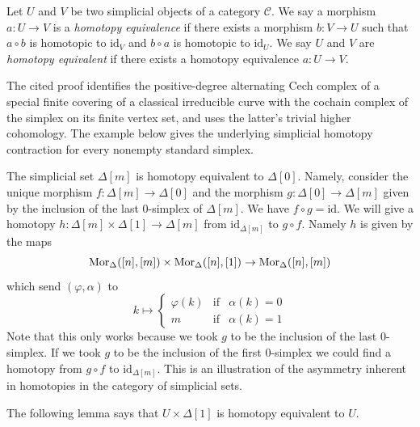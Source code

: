 \begin{definition}
\label{definition-homotopy-equivalent}
Let $U$ and $V$ be two simplicial objects of a category $\mathcal{C}$.
We say a morphism $a : U \to V$ is a {\it homotopy equivalence}
if there exists a morphism $b : V \to U$ such that $a \circ b$ is
homotopic to $\text{id}_V$ and $b \circ a$ is homotopic to $\text{id}_U$.
We say $U$ and $V$ are {\it homotopy equivalent} if there
exists a homotopy equivalence $a : U \to V$.
\end{definition}

\begin{example}
\label{example-simplex-contractible}
\begin{reference}
\cite[Chapter III, \S 1, no. 53, Lemma 4, p. 246]{FAC}
\end{reference}
\begin{history}
The cited proof identifies the positive-degree alternating Cech complex of a
special finite covering of a classical irreducible curve with the cochain
complex of the simplex on its finite vertex set, and uses the latter's
trivial higher cohomology. The example below gives the underlying simplicial
homotopy contraction for every nonempty standard simplex.
\end{history}
The simplicial set $\Delta[m]$ is homotopy equivalent to $\Delta[0]$.
Namely, consider the unique morphism $f : \Delta[m] \to \Delta[0]$ and
the morphism $g : \Delta[0] \to \Delta[m]$ given by the inclusion of the
last $0$-simplex of $\Delta[m]$. We have $f \circ g = \text{id}$.
We will give a homotopy $h : \Delta[m] \times \Delta[1] \to \Delta[m]$
from $\text{id}_{\Delta[m]}$ to $g \circ f$. Namely $h$ is given by
the maps
$$
\mathop{\mathrm{Mor}}\nolimits_\Delta([n], [m]) \times \mathop{\mathrm{Mor}}\nolimits_\Delta([n], [1]) \to \mathop{\mathrm{Mor}}\nolimits_\Delta([n], [m])
$$
which send $(\varphi, \alpha)$ to
$$
k \mapsto
\left\{
\begin{matrix}
\varphi(k) & \text{if} & \alpha(k) = 0 \\
m & \text{if} & \alpha(k) = 1
\end{matrix}
\right.
$$
Note that this only works because we took $g$ to be the inclusion of the
last $0$-simplex. If we took $g$ to be the inclusion of the first $0$-simplex
we could find a homotopy from $g \circ f$ to $\text{id}_{\Delta[m]}$.
This is an illustration of the asymmetry inherent in homotopies in the
category of simplicial sets.
\end{example}

\noindent
The following lemma says that $U \times \Delta[1]$
is homotopy equivalent to $U$.

